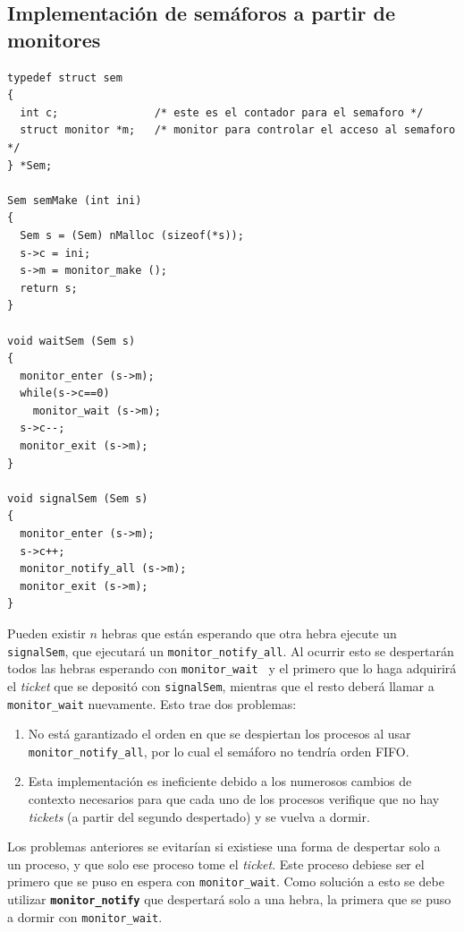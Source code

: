 \subsection{Implementación de semáforos a partir de monitores}
\begin{lstlisting}
typedef struct sem
{
  int c;               /* este es el contador para el semaforo */
  struct monitor *m;   /* monitor para controlar el acceso al semaforo */
} *Sem;

Sem semMake (int ini)
{
  Sem s = (Sem) nMalloc (sizeof(*s));
  s->c = ini;
  s->m = monitor_make ();
  return s;
}

void waitSem (Sem s)
{
  monitor_enter (s->m);
  while(s->c==0)
    monitor_wait (s->m);
  s->c--;
  monitor_exit (s->m);
}

void signalSem (Sem s)
{
  monitor_enter (s->m);
  s->c++;
  monitor_notify_all (s->m);
  monitor_exit (s->m);
}
\end{lstlisting}

Pueden existir $n$ hebras que están esperando que otra hebra ejecute un
\texttt{signalSem}, que ejecutará un \texttt{monitor\_notify\_all}. Al ocurrir
esto se despertarán todos las hebras esperando con \texttt{monitor\_wait } y el
primero que lo haga adquirirá el \emph{ticket} que se depositó con
\texttt{signalSem}, mientras que el resto deberá llamar a \texttt{monitor\_wait}
nuevamente. Esto trae dos problemas:

\begin{enumerate}

\item No está garantizado el orden en que se despiertan los procesos al usar
\texttt{monitor\_notify\_all}, por lo cual el semáforo no tendría orden FIFO.

\item Esta implementación es ineficiente debido a los numerosos cambios de
contexto necesarios para que cada uno de los procesos verifique que no hay
\emph{tickets} (a partir del segundo despertado) y se vuelva a dormir.

\end{enumerate}

Los problemas anteriores se evitarían si existiese una forma de despertar solo a
un proceso, y que solo ese proceso tome el \emph{ticket}. Este proceso debiese
ser el primero que se puso en espera con \texttt{monitor\_wait}. Como solución a
esto se debe utilizar \textbf{\texttt{monitor\_notify}} que despertará solo a
una hebra, la primera que se puso a dormir con \texttt{monitor\_wait}.

